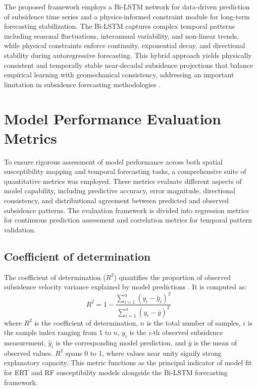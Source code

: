 \documentclass[oneside,doublespacing,flushright]{lsuthesis}
\begin{document}
The proposed framework employs a Bi-LSTM network for data-driven prediction of subsidence time series and a physics-informed constraint module for long-term forecasting stabilization. The Bi-LSTM captures complex temporal patterns including seasonal 
fluctuations, interannual variability, and non-linear trends, while physical constraints enforce continuity, exponential decay, and directional stability during autoregressive forecasting. This hybrid approach yields 
physically consistent and temporally stable near-decadal subsidence projections that balance empirical learning with geomechanical consistency, addressing an important limitation in subsidence forecasting methodologies \citep{Zhu2024,Mirmazloumi2023}.

\section{Model Performance Evaluation Metrics}
To ensure rigorous assessment of model performance across both spatial susceptibility mapping and temporal forecasting tasks, a comprehensive suite of quantitative metrics was employed. These metrics evaluate different aspects of model capability, including predictive accuracy, error magnitude, directional consistency, and distributional agreement between predicted and observed subsidence patterns. The evaluation framework is divided into regression metrics for continuous prediction assessment and correlation metrics for temporal pattern validation.

\subsection{Coefficient of determination}
The coefficient of determination ($R^2$) quantifies the proportion of observed subsidence velocity variance explained by model predictions \citep{Dormann2013}. It is computed as:
\begin{equation}
R^2 = 1 - \frac{\sum_{i=1}^{n}(y_i - \hat{y}_i)^2}{\sum_{i=1}^{n}(y_i - \bar{y})^2}
\end{equation}
where $R^2$ is the coefficient of determination, $n$ is the total number of samples, $i$ is the sample index ranging from 1 to $n$, $y_i$ is the $i$-th observed subsidence measurement, $\hat{y}_i$ is the corresponding model prediction, and $\bar{y}$ is the mean of observed values. $R^2$ spans 0 to 1, where values near unity signify strong explanatory capacity. This metric functions as the principal indicator of model fit for ERT and RF susceptibility models alongside the Bi-LSTM forecasting framework.
\end{document}
